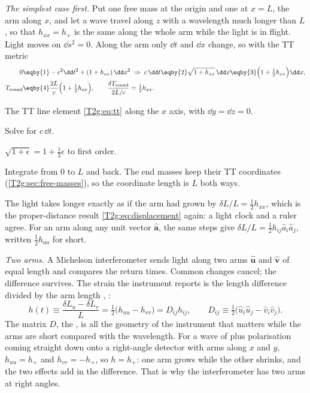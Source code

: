 \emph{The simplest case first.} Put one free mass at the origin and one at $x=L$, the arm along $x$, and let a wave travel along $z$ with a wavelength much longer than $L$, so that $h_{xx}=h_+$ is the same along the whole arm while the light is in flight. Light moves on $\dd s^2=0$. Along the arm only $\dd t$ and $\dd x$ change, so with the TT metric
\begin{align}
  0&\eqby{1}-c^2\dd t^2+(1+h_{xx})\,\dd x^2
  \;\Rightarrow\;
  c\,\dd t\eqby{2}\sqrt{1+h_{xx}}\,\dd x\eqby{3}\Big(1+\tfrac12h_{xx}\Big)\dd x,\nonumber\\
  T_{\rm round}&\eqby{4}\frac{2L}{c}\Big(1+\tfrac12h_{xx}\Big),
  \qquad
  \frac{\delta T_{\rm round}}{2L/c}=\tfrac12h_{xx}.
  \label{T2g:eq:arm}
\end{align}
\begin{explain}
  \item The TT line element \eqref{T2g:eq:tt} along the $x$ axis, with $\dd y=\dd z=0$.
  \item Solve for $c\,\dd t$.
  \item $\sqrt{1+\epsilon}=1+\tfrac12\epsilon$ to first order.
  \item Integrate from $0$ to $L$ and back. The end masses keep their TT coordinates (\cref{T2g:sec:free-masses}), so the coordinate length is $L$ both ways.
\end{explain}
The light takes longer exactly as if the arm had grown by $\delta L/L=\tfrac12h_{xx}$, which is the proper-distance result \eqref{T2g:eq:displacement} again: a light clock and a ruler agree. For an arm along any unit vector $\hat{\bm a}$, the same steps give $\delta L/L=\tfrac12h_{ij}\hat a_i\hat a_j$, written $\tfrac12h_{aa}$ for short.

\emph{Two arms.} A Michelson interferometer sends light along two arms $\hat{\bm u}$ and $\hat{\bm v}$ of equal length and compares the return times. Common changes cancel; the difference survives. The strain the instrument reports is the length difference divided by the arm length \cite[eq.~(5)]{LIGOGuide2020}, \cite[eq.~(11)]{BarackCutler2004}:
\begin{equation}
  h(t)\equiv\frac{\delta L_u-\delta L_v}{L}=\tfrac12\big(h_{uu}-h_{vv}\big)=D_{ij}h_{ij},
  \qquad D_{ij}\equiv\tfrac12\big(\hat u_i\hat u_j-\hat v_i\hat v_j\big).
  \label{T2g:eq:michelson}
\end{equation}
The matrix $D$, the , is all the geometry of the instrument that matters while the arms are short compared with the wavelength. For a wave of plus polarisation coming straight down onto a right-angle detector with arms along $x$ and $y$, $h_{uu}=h_+$ and $h_{vv}=-h_+$, so $h=h_+$: one arm grows while the other shrinks, and the two effects add in the difference. That is why the interferometer has two arms at right angles.

